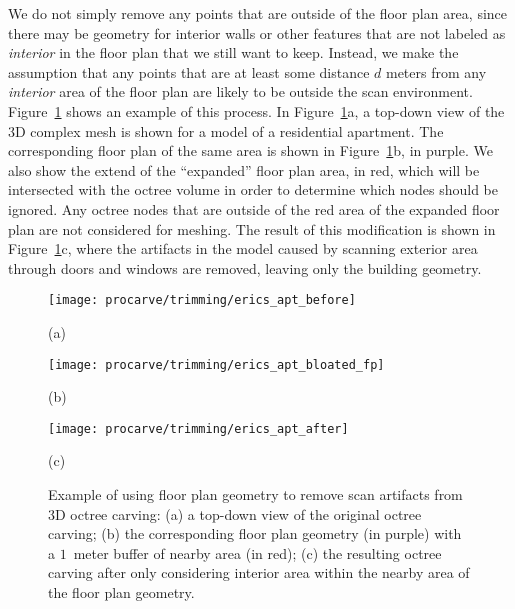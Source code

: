 \documentclass[12pt,onecolumn,oneside]{book}
\begin{document}
We do not simply remove any points that are outside of the floor plan area, since there may be geometry for interior walls or other features that are not labeled as {\it interior} in the floor plan that we still want to keep.  Instead, we make the assumption that any points that are at least some distance $d$ meters from any {\it interior} area of the floor plan are likely to be outside the scan environment.  Figure~\ref{fig:bloated_fp} shows an example of this process.  In Figure~\ref{fig:bloated_fp}a, a top-down view of the 3D complex mesh is shown for a model of a residential apartment.  The corresponding floor plan of the same area is shown in Figure~\ref{fig:bloated_fp}b, in purple.  We also show the extend of the ``expanded'' floor plan area, in red, which will be intersected with the octree volume in order to determine which nodes should be ignored.  Any octree nodes that are outside of the red area of the expanded floor plan are not considered for meshing.  The result of this modification is shown in Figure~\ref{fig:bloated_fp}c, where the artifacts in the model caused by scanning exterior area through doors and windows are removed, leaving only the building geometry.

\begin{figure}[t]

	\centering

	\begin{minipage}[t]{0.3\linewidth}
		\centerline{\texttt{[image: procarve/trimming/erics\_apt\_before]}}
		\centerline{(a)}\medskip
	\end{minipage}
	\hfill
	\begin{minipage}[t]{0.3\linewidth}
		\centerline{\texttt{[image: procarve/trimming/erics\_apt\_bloated\_fp]}}
		\centerline{(b)}\medskip
	\end{minipage}
	\hfill
	\begin{minipage}[t]{0.3\linewidth}
		\centerline{\texttt{[image: procarve/trimming/erics\_apt\_after]}}
		\centerline{(c)}\medskip
	\end{minipage}
	
	\caption[Removing artifacts from octree carving with floor plans.]{Example of using floor plan geometry to remove scan artifacts from 3D octree carving:  (a) a top-down view of the original octree carving; (b) the corresponding floor plan geometry (in purple) with a $1$~meter buffer of nearby area (in red); (c) the resulting octree carving after only considering interior area within the nearby area of the floor plan geometry.}
	\label{fig:bloated_fp}

\end{figure}
\end{document}
